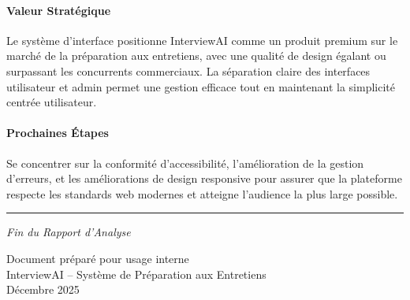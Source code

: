 \documentclass[12pt, a4paper]{report}
\begin{document}
\paragraph{Valeur Stratégique}
Le système d'interface positionne InterviewAI comme un produit premium sur le marché de la préparation aux entretiens, avec une qualité de design égalant ou surpassant les concurrents commerciaux. La séparation claire des interfaces utilisateur et admin permet une gestion efficace tout en maintenant la simplicité centrée utilisateur.

\paragraph{Prochaines Étapes}
Se concentrer sur la conformité d'accessibilité, l'amélioration de la gestion d'erreurs, et les améliorations de design responsive pour assurer que la plateforme respecte les standards web modernes et atteigne l'audience la plus large possible.

\vspace{1cm}

\noindent\rule{\textwidth}{0.4pt}

\begin{center}
\textit{Fin du Rapport d'Analyse}

\vspace{0.5cm}

Document préparé pour usage interne \\
InterviewAI -- Système de Préparation aux Entretiens \\
Décembre 2025
\end{center}
\end{document}
